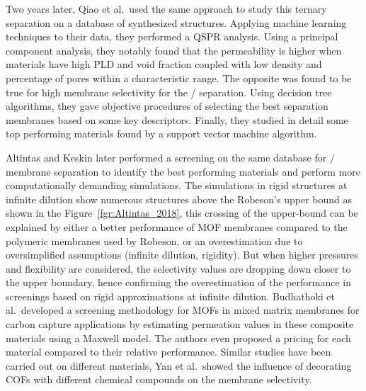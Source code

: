 \documentclass[main.tex]{subfiles}
\begin{document}
Two years later, Qiao et al.\ used the same approach to study this ternary separation on a database of synthesized structures.\autocite{Qiao_2018} Applying machine learning techniques to their data, they performed a QSPR analysis. Using a principal component analysis, they notably found that the permeability is higher when materials have high PLD and void fraction coupled with low density and percentage of pores within a characteristic range. The opposite was found to be true for high membrane selectivity for the / separation. Using decision tree algorithms, they gave objective procedures of selecting the best separation membranes based on some key descriptors. Finally, they studied in detail some top performing materials found by a support vector machine algorithm.

Altintas and Keskin later performed a screening on the same database for / membrane separation to identify the best performing materials and perform more computationally demanding simulations.\autocite{Altintas_2018} {The simulations in rigid structures at infinite dilution show numerous structures above the Robeson's upper bound as shown in the Figure~\ref{fgr:Altintas_2018}, this crossing of the upper-bound can be explained by either a better performance of MOF membranes compared to the polymeric membranes used by Robeson, or an overestimation due to oversimplified assumptions (infinite dilution, rigidity). But when higher pressures and flexibility are considered, the selectivity values are dropping down closer to the upper boundary}, hence confirming the overestimation of the performance in screenings {based on rigid approximations at infinite dilution}.  Budhathoki et al.\ developed a screening methodology for MOFs in mixed matrix membranes for carbon capture applications by estimating permeation values in these composite materials using a Maxwell model.\autocite{Budhathoki_2019} The authors even proposed a pricing for each material compared to their relative performance. Similar studies have been carried out on different materials, Yan et al.\ showed the influence of decorating COFs with different chemical compounds on the membrane selectivity.\autocite{Yan_2018}
\end{document}
